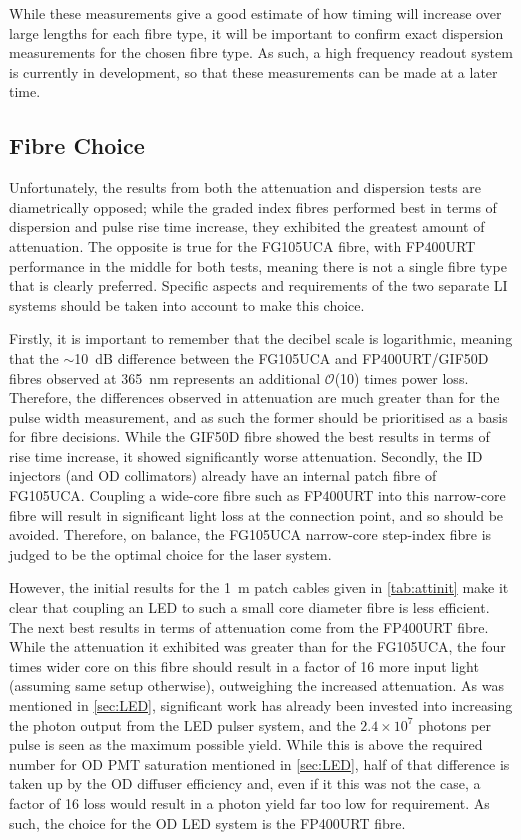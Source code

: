 \documentclass[a4paper,11pt]{article}
\let\oldsim\sim
\renewcommand{\sim}{{\oldsim}}
\begin{document}
While these measurements give a good estimate of how timing will increase over large lengths for each fibre type, it will be important to confirm exact dispersion measurements for the chosen fibre type. As such, a high frequency readout system is currently in development, so that these measurements can be made at a later time.

\subsection{Fibre Choice}\label{sec:fibre:sub:choice}

Unfortunately, the results from both the attenuation and dispersion tests are diametrically opposed; while the graded index fibres performed best in terms of dispersion and pulse rise time increase, they exhibited the greatest amount of attenuation. The opposite is true for the FG105UCA fibre, with FP400URT performance in the middle for both tests, meaning there is not a single fibre type that is clearly preferred. Specific aspects and requirements of the two separate LI systems should be taken into account to make this choice.

Firstly, it is important to remember that the decibel scale is logarithmic, meaning that the $\sim$10~dB difference between the FG105UCA and FP400URT/GIF50D fibres observed at 365~nm represents an additional $\mathcal{O}$(10) times power loss. Therefore, the differences observed in attenuation are much greater than for the pulse width measurement, and as such the former should be prioritised as a basis for fibre decisions. While the GIF50D fibre showed the best results in terms of rise time increase, it showed significantly worse attenuation. Secondly, the ID injectors (and OD collimators) already have an internal patch fibre of FG105UCA. Coupling a wide-core fibre such as FP400URT into this narrow-core fibre will result in significant light loss at the connection point, and so should be avoided. Therefore, on balance, the FG105UCA narrow-core step-index fibre is judged to be the optimal choice for the laser system.

However, the initial results for the 1~m patch cables given in \cref{tab:attinit} make it clear that coupling an LED to such a small core diameter fibre is less efficient. The next best results in terms of attenuation come from the FP400URT fibre. While the attenuation it exhibited was greater than for the FG105UCA, the four times wider core on this fibre should result in a factor of 16 more input light (assuming same setup otherwise), outweighing the increased attenuation. As was mentioned in \cref{sec:LED}, significant work has already been invested into increasing the photon output from the LED pulser system, and the $2.4\times10^7$ photons per pulse is seen as the maximum possible yield. While this is above the required number for OD PMT saturation mentioned in \cref{sec:LED}, half of that difference is taken up by the OD diffuser efficiency and, even if it this was not the case, a factor of 16 loss would result in a photon yield far too low for requirement. As such, the choice for the OD LED system is the FP400URT fibre.
\end{document}
